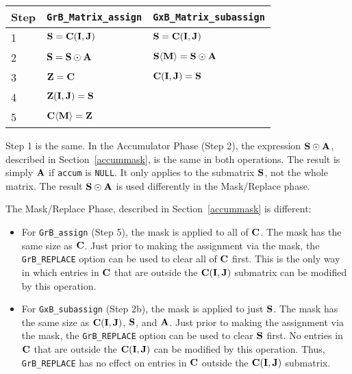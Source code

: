 \documentclass[12pt]{article}
\begin{document}
\vspace{0.1in}
\begin{tabular}{lll}
\hline
Step & \verb'GrB_Matrix_assign'                & \verb'GxB_Matrix_subassign'                        \\
\hline
1 & ${\bf S} = {\bf C(I,J)}$                & ${\bf S} = {\bf C(I,J)}$                              \\
2 & ${\bf S} = {\bf S} \odot {\bf A}$       & ${\bf S \langle M \rangle} = {\bf S} \odot {\bf A}$   \\
3 & ${\bf Z} = {\bf C}$                     & ${\bf C(I,J)}= {\bf S}$                               \\
4 & ${\bf Z(I,J)} = {\bf S}$                &                                                       \\
5 & ${\bf C \langle M \rangle = Z}$         &                                                       \\
\hline
\end{tabular}
\vspace{0.1in}

Step 1 is the same.  In the Accumulator Phase (Step 2), the expression
${\bf S} \odot {\bf A}$,
described in Section~\ref{accummask}, is the same in both
operations.  The result is simply ${\bf A}$ if \verb'accum' is \verb'NULL'.  It
only applies to the submatrix ${\bf S}$, not the whole matrix.
The result ${\bf S} \odot {\bf A}$ is used differently in the Mask/Replace
phase.

The Mask/Replace Phase, described in Section~\ref{accummask} is different:
\begin{itemize}
\item
    For \verb'GrB_assign' (Step 5), the mask is applied to all of ${\bf
    C}$.  The mask has the same size as ${\bf C}$.  Just prior to making the
    assignment via the mask, the \verb'GrB_REPLACE' option can be used to clear
    all of ${\bf C}$ first.  This is the only way in which entries in ${\bf C}$ that
    are outside the ${\bf C(I,J)}$ submatrix can be modified by this operation.

\item
    For \verb'GxB_subassign' (Step 2b), the mask is applied to just
    ${\bf S}$.  The mask has the same size as ${\bf C(I,J)}$, ${\bf S}$, and
    ${\bf A}$.  Just prior to making the assignment via the mask, the
    \verb'GrB_REPLACE' option can be used to clear ${\bf S}$ first.  No entries
    in ${\bf C}$ that are outside the ${\bf C(I,J)}$ can be modified by this
    operation.  Thus, \verb'GrB_REPLACE' has no effect on entries in ${\bf C}$
    outside the ${\bf C(I,J)}$ submatrix.

\end{itemize}
\end{document}

